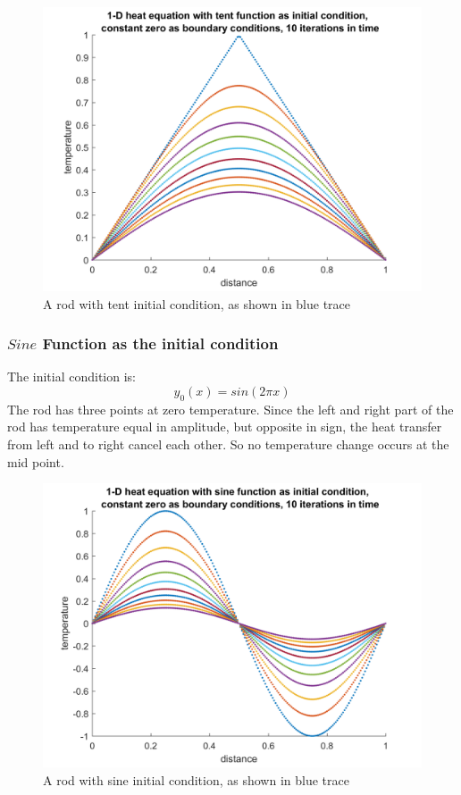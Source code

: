 \documentclass[a4paper, 12pt]{article}
\begin{document}
\begin{figure}[h]
\centering
\includegraphics[width=\textwidth]{ex4/plots/tent.png}
\caption{A rod with tent initial condition, as shown in blue trace}
\end{figure}



\newpage
\subsubsection{$Sine$ Function as the initial condition}
The initial condition is:
\[ y_0(x)= sin(2\pi x) \]
The rod has three points at zero temperature. Since the left and right part of the rod has temperature equal in amplitude, but opposite in sign, the heat transfer from left and to right cancel each other. So no temperature change occurs at the mid point.

\begin{figure}[h]
\centering
\includegraphics[width=\textwidth]{ex4/plots/sine.png}
\caption{A rod with sine initial condition, as shown in blue trace}
\end{figure}

\end{document}
